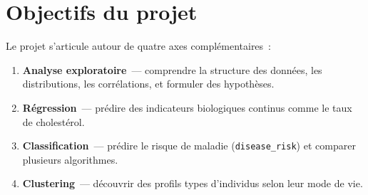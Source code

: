 \section*{Objectifs du projet}

Le projet s'articule autour de quatre axes complémentaires~:

\begin{enumerate}
  \item \textbf{Analyse exploratoire}~--- comprendre la structure des données, les distributions, les corrélations, et formuler des hypothèses.
  \item \textbf{Régression}~--- prédire des indicateurs biologiques continus comme le taux de cholestérol.
  \item \textbf{Classification}~--- prédire le risque de maladie (\texttt{disease\_risk}) et comparer plusieurs algorithmes.
  \item \textbf{Clustering}~--- découvrir des profils types d'individus selon leur mode de vie.
\end{enumerate}
